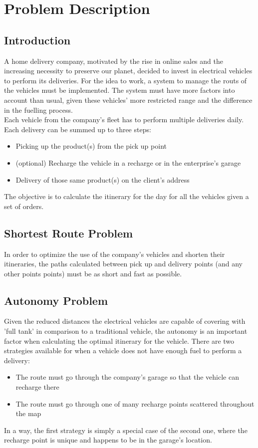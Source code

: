 \chapter{Problem Description}


\section{Introduction}
A home delivery company, motivated by the rise in online sales and the increasing necessity to preserve our planet, decided to invest in electrical vehicles to perform its deliveries. For the idea to work, a system to manage the routs of the vehicles must be implemented. The system must have more factors into account than usual, given these vehicles' more restricted range and the difference in the fuelling process.\\

Each vehicle from the company's fleet has to perform multiple deliveries daily. Each delivery can be summed up to three steps:
\begin{itemize}
	\item Picking up the product(s) from the pick up point
	\item (optional) Recharge the vehicle in a recharge  or in the enterprise's garage
	\item Delivery of those same product(s) on the client's address
\end{itemize}

The objective is to calculate the itinerary for the day for all the vehicles given a set of orders.


\section{Shortest Route Problem}
In order to optimize the use of the company's vehicles and shorten their itineraries, the paths calculated between pick up and delivery points (and any other points points) must be as short and fast as possible.  


\section{Autonomy Problem}
Given the reduced distances the electrical vehicles are capable of covering with 'full tank' in comparison to a traditional vehicle, the autonomy is an important factor when calculating the optimal itinerary for the vehicle. There are two strategies available for when a vehicle does not have enough fuel to perform a delivery:
\begin{itemize}
    \item The route must go through the company's  garage so that the vehicle can recharge there
    \item The route must go through one of many recharge points scattered throughout the map
\end{itemize}
In a way, the first strategy is simply a special case of the second one, where the recharge point is unique and happens to be in the garage's location.



